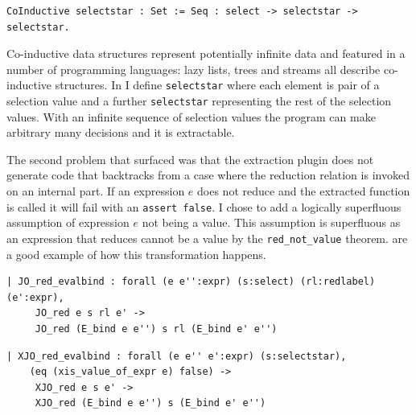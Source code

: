\documentclass[12pt,twoside,notitlepage]{report}
\begin{document}
\begin{minipage}{\linewidth}

\begin{lstlisting}[language={Coq},caption={Coq co-inductive selection sequence}, label={lst:coqselectstar}]
CoInductive selectstar : Set := Seq : select -> selectstar -> selectstar.
\end{lstlisting}

\end{minipage}

Co-inductive data structures represent potentially infinite data and featured in a number of programming languages: lazy lists, trees and streams all describe co-inductive structures. In  I define \verb|selectstar| where each element is pair of a selection value and a further \verb|selectstar| representing the rest of the selection values.  With an infinite sequence of selection values the program can make arbitrary many decisions and it is extractable.

The second problem that surfaced was that the extraction plugin does not generate code that backtracks from a case where the reduction relation is invoked on an internal part. If an expression $ e $ does not reduce and the extracted function is called it will fail with an \lstinline|assert false|. I chose to add a logically superfluous assumption of expression $ e $ not being a value. This assumption is superfluous as an expression that reduces cannot be a value by the \verb|red_not_value| theorem.   are a good example of how this transformation happens. \vspace{4mm}

\begin{minipage}{0.9\linewidth}

\begin{lstlisting}[language={Coq},caption={Coq reduction clause with unsafe assumption}, label={lst:coqredunsafe}]
| JO_red_evalbind : forall (e e'':expr) (s:select) (rl:redlabel) (e':expr),
     JO_red e s rl e' ->
     JO_red (E_bind e e'') s rl (E_bind e' e'')
\end{lstlisting}

\end{minipage}

\begin{minipage}{\linewidth}

\begin{lstlisting}[language={Coq},caption={Coq extractable reduction clause with safe assumption}, label={lst:coqxredsafe}]
 | XJO_red_evalbind : forall (e e'' e':expr) (s:selectstar),
    (eq (xis_value_of_expr e) false) ->
     XJO_red e s e' ->
     XJO_red (E_bind e e'') s (E_bind e' e'')
\end{lstlisting}

\end{minipage}
\end{document}
